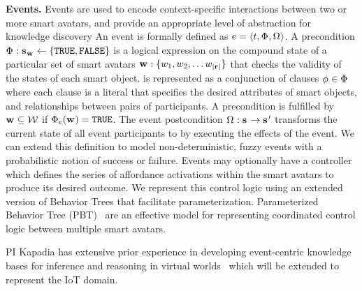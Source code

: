 
\noindent \textbf{Events.} Events are used to encode context-specific interactions between two or more smart avatars, and provide an appropriate level of abstraction for knowledge discovery  An event is formally defined as $e{} = \langle t,  {\Phi}_{}, {\Omega}_{} \rangle$. A precondition ${\Phi}_{}: \mathbf{s_{}}_{\mathbf{w}_{}} \leftarrow \{\textnormal{\texttt{TRUE}}, \textnormal{\texttt{FALSE}} \} $ is a logical expression on the compound state \groupState{\smartObjectGroup{}} of a particular set of smart avatars $\mathbf{w}_{}: \{ w_{1}, w_{2}, \ldots w_{|\mathbf{r}_{}|} \}$ that checks the validity of the states of each smart object. \precondition{} is represented as a conjunction of clauses $\phi_{}^{} \in {\Phi}_{}$ where each clause \clause{}{} is a literal that specifies the desired attributes of smart objects, and relationships between pairs of participants. A precondition is fulfilled by $\mathbf{w}_{} \subseteq \mathcal{W} $ if ${\Phi}_{e}(\mathbf{w}_{}) = \textnormal{\texttt{TRUE}}$. The event postcondition ${\Omega}_{} : \mathbf{s_{}}_{} \rightarrow \mathbf{s_{}}_{}{'}$ transforms the current state of all event participants \groupState{} to \nextGroupState{} by executing the effects of the event. We can extend this definition to model non-deterministic, fuzzy events with a probabilistic notion of success or failure. Events may optionally have a controller which defines the series of affordance activations within the smart avatars to produce its desired outcome. We represent this control logic using an extended version of Behavior Trees that facilitate parameterization. Parameterized Behavior Tree (PBT)~\cite{Shoulson:2011:PBT:2177817.2177835} are an effective model for representing coordinated control logic  between multiple smart avatars. 

PI Kapadia has extensive prior experience in developing event-centric knowledge bases for inference and reasoning in virtual worlds~\cite{Shoulson:2013:EPA:2522628.2522629,2015-fdg-bstl,Kapadia:2015:CAI:2699276.2699279,Kapadia:2016:CCN:2982818.2982846} which will be extended to represent the IoT domain. 


